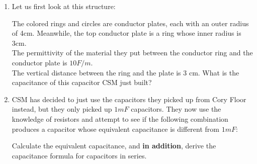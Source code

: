 \begin{enumerate}
    \item {
        Let us first look at this structure:
        \begin{center}
            
        \end{center}
        The colored rings and circles are conductor plates, each with an outer radius of 4cm. Meanwhile, the top conductor plate is a ring whose inner radius is 3cm. \\
        The permittivity of the material they put between the conductor ring and the conductor plate is $10 F/m$. \\
        The vertical distance between the ring and the plate is 3 cm.
        What is the capacitance of this capacitor CSM just built?
        
    }
    
    \item {
        CSM has decided to just use the capacitors they picked up from Cory Floor instead, but they only picked up $1mF$ capacitors. They now use the knowledge of resistors and attempt to see if the following combination produces a capacitor whose equivalent capacitance is different from $1mF$:
        \begin{center}
            
        \end{center}
        Calculate the equivalent capacitance, and \textbf{in addition}, derive the capacitance formula for capacitors in series.
    
}
\end{enumerate}
